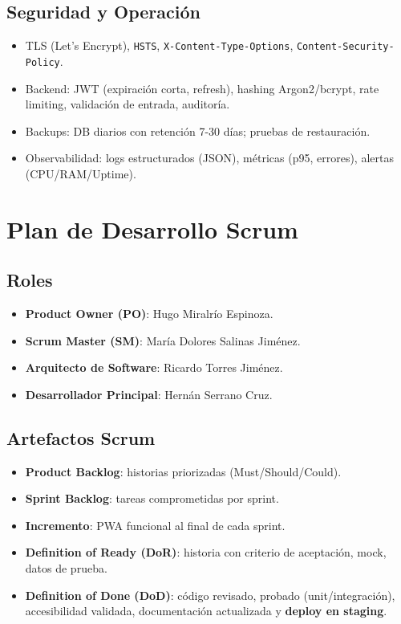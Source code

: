 \documentclass[12pt]{article}
\begin{document}
\subsection{Seguridad y Operación}
\begin{itemize}[left=0pt, itemsep=4pt]
  \item TLS (Let's Encrypt), \texttt{HSTS}, \texttt{X-Content-Type-Options}, \texttt{Content-Security-Policy}.
  \item Backend: JWT (expiración corta, refresh), hashing Argon2/bcrypt, rate limiting, validación de entrada, auditoría.
  \item Backups: DB diarios con retención 7-30 días; pruebas de restauración.
  \item Observabilidad: logs estructurados (JSON), métricas (p95, errores), alertas (CPU/RAM/Uptime).
\end{itemize}

\section{Plan de Desarrollo Scrum}
\subsection{Roles}
\begin{itemize}[left=0pt, itemsep=4pt]
  \item \textbf{Product Owner (PO)}: Hugo Miralrío Espinoza.
  \item \textbf{Scrum Master (SM)}: María Dolores Salinas Jiménez.
  \item \textbf{Arquitecto de Software}: Ricardo Torres Jiménez.
  \item \textbf{Desarrollador Principal}: Hernán Serrano Cruz.
\end{itemize}

\subsection{Artefactos Scrum}
\begin{itemize}[left=0pt, itemsep=4pt]
  \item \textbf{Product Backlog}: historias priorizadas (Must/Should/Could).
  \item \textbf{Sprint Backlog}: tareas comprometidas por sprint.
  \item \textbf{Incremento}: PWA funcional al final de cada sprint.
  \item \textbf{Definition of Ready (DoR)}: historia con criterio de aceptación, mock, datos de prueba.
  \item \textbf{Definition of Done (DoD)}: código revisado, probado (unit/integración), accesibilidad validada, documentación actualizada y \textbf{deploy en staging}.
\end{itemize}
\end{document}
